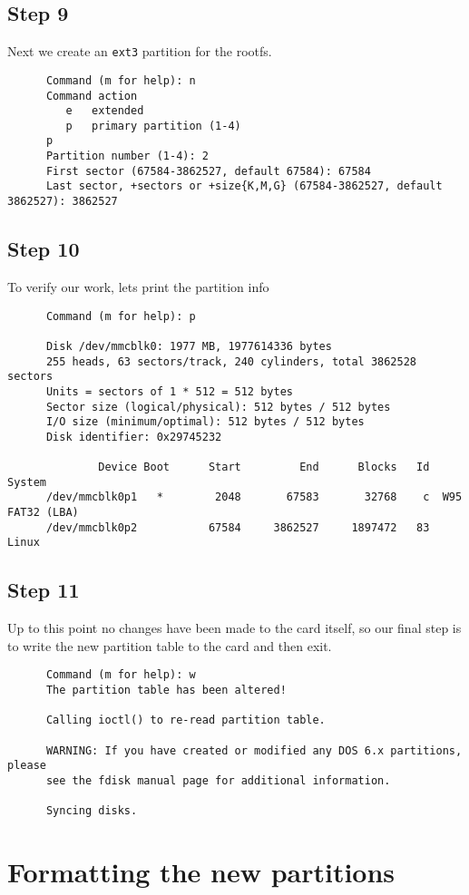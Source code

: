 \documentclass{article}
\begin{document}
   \subsection*{Step 9}
      Next we create an \texttt{ext3} partition for the rootfs. 
      \begin{verbatim}
      Command (m for help): n 
      Command action 
         e   extended 
         p   primary partition (1-4) 
      p 
      Partition number (1-4): 2 
      First sector (67584-3862527, default 67584): 67584
      Last sector, +sectors or +size{K,M,G} (67584-3862527, default 3862527): 3862527
      \end{verbatim}
   \subsection*{Step 10}
      To verify our work, lets print the partition info 
      \begin{verbatim}
      Command (m for help): p 

      Disk /dev/mmcblk0: 1977 MB, 1977614336 bytes
      255 heads, 63 sectors/track, 240 cylinders, total 3862528 sectors
      Units = sectors of 1 * 512 = 512 bytes
      Sector size (logical/physical): 512 bytes / 512 bytes
      I/O size (minimum/optimal): 512 bytes / 512 bytes
      Disk identifier: 0x29745232

              Device Boot      Start         End      Blocks   Id  System
      /dev/mmcblk0p1   *        2048       67583       32768    c  W95 FAT32 (LBA)
      /dev/mmcblk0p2           67584     3862527     1897472   83 Linux
      \end{verbatim}
   \subsection*{Step 11}
      Up to this point no changes have been made to the card itself, so our
      final step is to write the new partition table to the card and then exit.
      \begin{verbatim}
      Command (m for help): w 
      The partition table has been altered! 

      Calling ioctl() to re-read partition table. 

      WARNING: If you have created or modified any DOS 6.x partitions, please 
      see the fdisk manual page for additional information. 

      Syncing disks.
      \end{verbatim}
   \section*{Formatting the new partitions}
\end{document}
